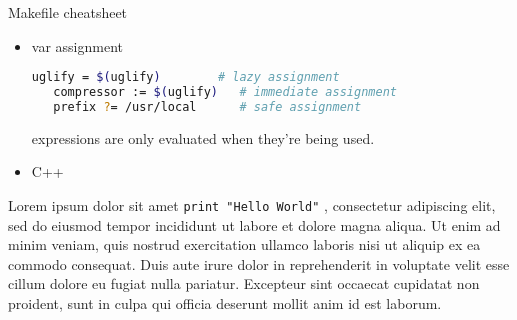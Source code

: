 \documentclass[a4paper]{article}
\begin{document}
Makefile cheatsheet

\begin{itemize}
 \item var assignment
  \begin{lstlisting}[language=bash]
   uglify = $(uglify)        # lazy assignment
   compressor := $(uglify)   # immediate assignment
   prefix ?= /usr/local      # safe assignment
  \end{lstlisting}
expressions are only evaluated when they’re being used.
 \item C++
\end{itemize}
Lorem ipsum dolor sit amet \lstinline{print "Hello World"} , consectetur adipiscing elit, sed do eiusmod tempor incididunt ut labore et dolore magna aliqua. Ut enim ad minim veniam, quis nostrud exercitation ullamco laboris nisi ut aliquip ex ea commodo consequat. Duis aute irure dolor in reprehenderit in voluptate velit esse cillum dolore eu fugiat nulla pariatur. Excepteur sint occaecat cupidatat non proident, sunt in culpa qui officia deserunt mollit anim id est laborum.
\end{document}
